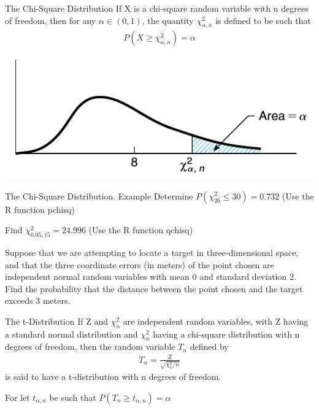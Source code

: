 \documentclass{beamer}
\renewcommand{\P}[1]{P\left(#1\right)}
\begin{document}
\begin{frame}{The Chi-Square Distribution}
  If X is a chi-square random variable with n degrees of freedom, then for any
  $\alpha \in (0, 1)$, the quantity $\chi_{\alpha,n}^2$ is defined to be such
  that
  \begin{align*}
    \P{X \geq \chi_{\alpha,n}^2 }= \alpha
  \end{align*}
  \includegraphics[width=\linewidth]{chi-alpha-n}
\end{frame}

\begin{frame}[t]{The Chi-Square Distribution. Example}
  Determine $\P{\chi_{26}^2 \leq 30}=0.732$ (Use the R function pchisq)

  Find $\chi_{0.05,15}^2=24.996$ (Use the R function qchisq)

  Suppose that we are attempting to locate a target in three-dimensional space,
  and that the three coordinate errors (in meters) of the point chosen are
  independent normal random variables with mean 0 and standard deviation 2. Find
  the probability that the distance between the point chosen and the target
  exceeds 3 meters.

\end{frame}

\begin{frame}{The t-Distribution}
  If Z and $\chi_n^2$ are independent random variables, with Z having a standard
  normal distribution and $\chi_n^2$ having a chi-square distribution with n
  degrees of freedom, then the random variable $T_n$ defined by
  \begin{align*}
    T_n = \frac{Z}{\sqrt{\chi_n^2/n}}
  \end{align*}
  is said to have a t-distribution with n degrees of freedom.

  For let $t_{\alpha,n}$ be such that $\P{T_n \geq t_{\alpha,n} } = \alpha$
\end{frame}
\end{document}
